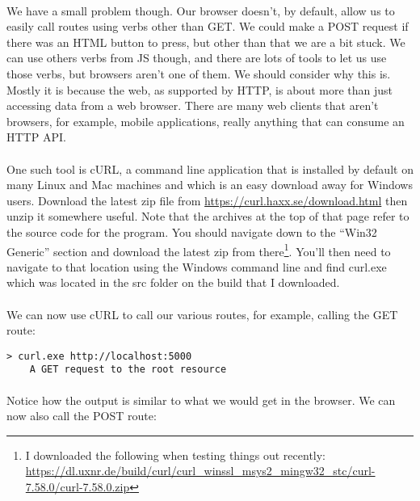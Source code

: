 \documentclass[10pt, a4paper, twosize]{article}
\begin{document}
\paragraph{} We have a small problem though. Our browser doesn't, by default, allow us to easily call routes using verbs other than GET. We could make a POST request if there was an HTML button to press, but other than that we are a bit stuck. We can use others verbs from JS though, and there are lots of tools to let us use those verbs, but browsers aren't one of them. We should consider why this is. Mostly it is because the web, as supported by HTTP, is about more than just accessing data from a web browser. There are many web clients that aren't browsers, for example, mobile applications, really anything that can consume an HTTP API.

\paragraph{} One such tool is cURL, a command line application that is installed by default on many Linux and Mac machines and which is an easy download away for Windows users. Download the latest zip file from \url{https://curl.haxx.se/download.html} then unzip it somewhere useful. Note that the archives at the top of that page refer to the source code for the program. You should navigate down to the ``Win32 Generic'' section and download the latest zip from there\footnote{I downloaded the following when testing things out recently: \url{https://dl.uxnr.de/build/curl/curl_winssl_msys2_mingw32_stc/curl-7.58.0/curl-7.58.0.zip}}. You'll then need to navigate to that location using the Windows command line and find curl.exe which was located in the src folder on the build that I downloaded.

\paragraph{} We can now use cURL to call our various routes, for example, calling the GET route:

\begin{lstlisting}[style=DOS]
    > curl.exe http://localhost:5000
    A GET request to the root resource
\end{lstlisting}

\paragraph{} Notice how the output is similar to what we would get in the browser. We can now also call the POST route:
\end{document}
